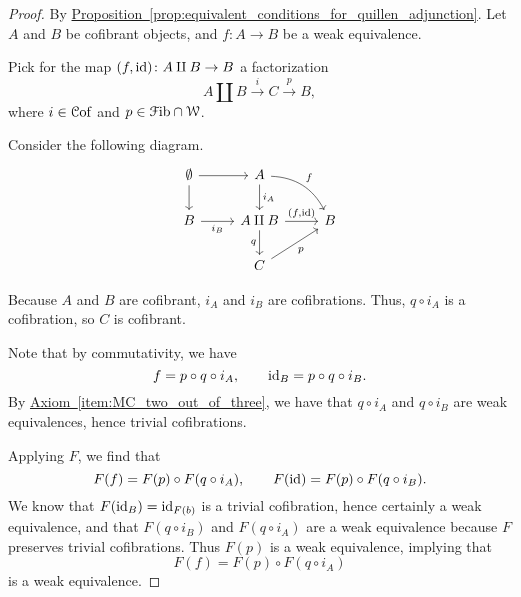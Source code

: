 \documentclass[main.tex]{subfiles}
\begin{document}
\begin{proof}
  By \hyperref[prop:equivalent_conditions_for_quillen_adjunction]{Proposition~\ref*{prop:equivalent_conditions_for_quillen_adjunction}}. Let $A$ and $B$ be cofibrant objects, and $f\colon A \to B$ be a weak equivalence.

  Pick for the map $(f, \mathrm{id})\colon A \amalg B \to B$ a factorization
  \begin{equation*}
    A \amalg B \overset{i}{\to} C \overset{p}{\to} B,
  \end{equation*}
  where $i \in \mathcal{C}\mathrm{of}$ and $p \in \mathcal{F}\mathrm{ib} \cap \mathcal{W}$.

  Consider the following diagram.
  \begin{equation*}
    \begin{tikzcd}
      \emptyset
      \arrow[r]
      \arrow[d]
      & A
      \arrow[dr, bend left, "f"]
      \arrow[d, "i_{A}"]
      \\
      B
      \arrow[r, swap, "i_{B}"]
      & A \amalg B
      \arrow[r, "{(f, \id)}"]
      \arrow[d, swap, "q"]
      & B
      \\
      & C
      \arrow[ur, swap, "p"]
    \end{tikzcd}
  \end{equation*}

  Because $A$ and $B$ are cofibrant, $i_{A}$ and $i_{B}$ are cofibrations. Thus, $q \circ i_{A}$ is a cofibration, so $C$ is cofibrant.

  Note that by commutativity, we have
  \begin{equation*}
    f = p \circ q \circ i_{A},\qquad \mathrm{id}_{B} = p \circ q \circ i_{B}.
  \end{equation*}
  By \hyperref[item:MC_two_out_of_three]{Axiom~\ref*{item:MC_two_out_of_three}}, we have that $q \circ i_{A}$ and $q \circ i_{B}$ are weak equivalences, hence trivial cofibrations.

  Applying $F$, we find that
  \begin{equation*}
    F(f) = F(p) \circ F(q \circ i_{A}),\qquad F(\mathrm{id}) = F(p) \circ F(q \circ i_{B}).
  \end{equation*}
  We know that $F(\mathrm{id}_{B}) = \mathrm{id}_{F(b)}$ is a trivial cofibration, hence certainly a weak equivalence, and that $F(q \circ i_{B})$ and $F(q \circ i_{A})$ are a weak equivalence because $F$ preserves trivial cofibrations. Thus $F(p)$ is a weak equivalence, implying that
  \begin{equation*}
    F(f) = F(p) \circ F(q \circ i_{A})
  \end{equation*}
  is a weak equivalence.
\end{proof}
\end{document}
